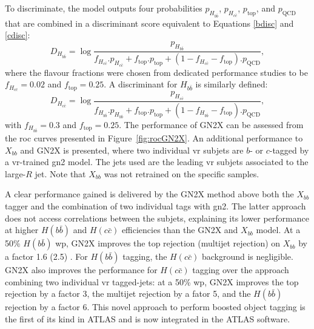 To discriminate, the model outputs four probabilities $p_{H_{b\bar{b}}}$, $p_{H_{c\bar{c}}}$, $p_{\textrm{top}}$, and $p_{\textrm{QCD}}$ that are combined in a discriminant score equivalent to Equations \ref{bdisc} and \ref{cdisc}: 
\begin{equation}
  D_{H_{b\bar{b}}} = \log \frac{p_{H_{b\bar{b}}}}{f_{H_{c\bar{c}}} . p_{H_{c\bar{c}}} + f_{\textrm{top}} . p_{\textrm{top}} + (1 - f_{H_{c\bar{c}}} - f_{\textrm{top}}) . p_{\textrm{QCD}}},
\end{equation}
where the flavour fractions were chosen from dedicated performance studies to be $f_{H_{c\bar{c}}} = 0.02$ and $f_{\textrm{top}} = 0.25$. A discriminant for $H_{b\bar{b}}$ is similarly defined:
\begin{equation}
  D_{H_{c\bar{c}}} = \log \frac{p_{H_{c\bar{c}}}}{f_{H_{b\bar{b}}} . p_{H_{b\bar{b}}} + f_{\textrm{top}} . p_{\textrm{top}} + (1 - f_{H_{b\bar{b}}} - f_{\textrm{top}}) . p_{\textrm{QCD}}},
\end{equation}
with $f_{H_{b\bar{b}}} = 0.3$ and $f_{\textrm{top}} = 0.25$. The performance of GN2X can be assessed from the \gls{roc} curves presented in Figure~\ref{fig:rocGN2X}. An additional performance to $X_{bb}$ and GN2X is presented, where two individual \gls{vr} subjets are $b$- or $c$-tagged by a \gls{vr}-trained \gls{gn2} model. The jets used are the leading \gls{vr} subjets associated to the large-$R$ jet. Note that $X_{bb}$ was not retrained on the specific samples.


A clear performance gained is delivered by the GN2X method above both the $X_{bb}$ tagger and the combination of two individual tags with \gls{gn2}. The latter approach does not access correlations between the subjets, explaining its lower performance at higher $H(b\bar{b})$ and $H(c\bar{c})$ efficiencies than the GN2X and $X_{bb}$ model. At a 50\% $H(b\bar{b})$ \gls{wp}, GN2X improves the top rejection (multijet rejection) on $X_{bb}$ by a factor 1.6 (2.5) \cite{ATL-PHYS-PUB-2023-021}. For $H(b\bar{b})$ tagging, the $H(c\bar{c})$ background is negligible. GN2X also improves the performance for $H(c\bar{c})$ tagging over the approach combining two individual \gls{vr} tagged-jets: at a 50\% \gls{wp}, GN2X improves the top rejection by a factor 3, the multijet rejection by a fator 5, and the $H(b\bar{b})$ rejection by a factor 6. This novel approach to perform boosted object tagging is the first of its kind in ATLAS and is now integrated in the ATLAS software.

